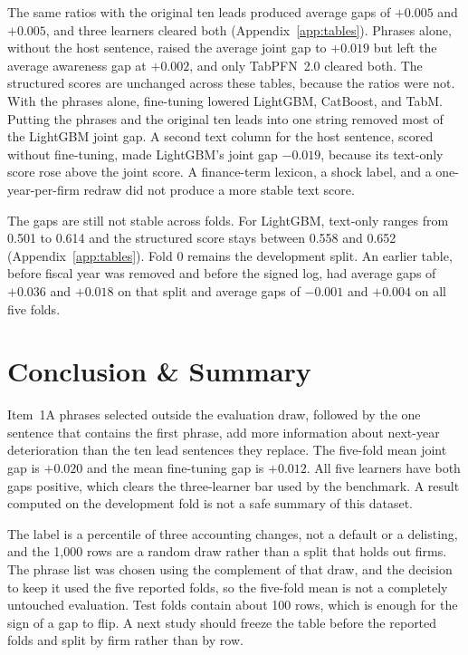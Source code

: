 \documentclass{article}
\begin{document}
The same ratios with the original ten leads produced average gaps of $+0.005$ and $+0.005$, and three learners cleared both (Appendix~\ref{app:tables}).
Phrases alone, without the host sentence, raised the average joint gap to $+0.019$ but left the average awareness gap at $+0.002$, and only TabPFN~2.0 cleared both.
The structured scores are unchanged across these tables, because the ratios were not.
With the phrases alone, fine-tuning lowered LightGBM, CatBoost, and TabM.
Putting the phrases and the original ten leads into one string removed most of the LightGBM joint gap.
A second text column for the host sentence, scored without fine-tuning, made LightGBM's joint gap $-0.019$, because its text-only score rose above the joint score.
A finance-term lexicon, a shock label, and a one-year-per-firm redraw did not produce a more stable text score.

The gaps are still not stable across folds.
For LightGBM, text-only ranges from 0.501 to 0.614 and the structured score stays between 0.558 and 0.652 (Appendix~\ref{app:tables}).
Fold 0 remains the development split.
An earlier table, before fiscal year was removed and before the signed log, had average gaps of $+0.036$ and $+0.018$ on that split and average gaps of $-0.001$ and $+0.004$ on all five folds.

\section{Conclusion \& Summary}

Item~1A phrases selected outside the evaluation draw, followed by the one sentence that contains the first phrase, add more information about next-year deterioration than the ten lead sentences they replace.
The five-fold mean joint gap is $+0.020$ and the mean fine-tuning gap is $+0.012$.
All five learners have both gaps positive, which clears the three-learner bar used by the benchmark.
A result computed on the development fold is not a safe summary of this dataset.

The label is a percentile of three accounting changes, not a default or a delisting, and the 1{,}000 rows are a random draw rather than a split that holds out firms.
The phrase list was chosen using the complement of that draw, and the decision to keep it used the five reported folds, so the five-fold mean is not a completely untouched evaluation.
Test folds contain about 100 rows, which is enough for the sign of a gap to flip.
A next study should freeze the table before the reported folds and split by firm rather than by row.
\end{document}
